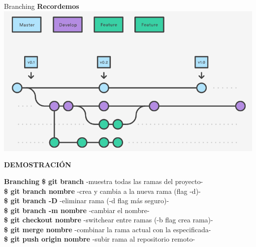 \documentclass{beamer}
\begin{document}
	\begin{frame}{Branching}
		\textbf{Recordemos}\\ \vspace{.4cm}
		\includegraphics[scale=.35]{img/git_project.png}
		
	\end{frame}

	\begin{frame}
		\textbf{DEMOSTRACIÓN} 
		\begin{block}{\textbf{Branching}}
			\vspace{0.12cm}
			\normalsize \textbf{\$ git branch}   \small -muestra todas las ramas del proyecto- \\
			\vspace{0.12cm}
			\normalsize \textbf{\$ git branch nombre}    \small -crea y cambia a la nueva rama (flag -d)-\\
			\vspace{0.12cm}
			\normalsize \textbf{\$ git branch -D }\small -eliminar rama (-d flag más seguro)-\\
			\vspace{0.12cm}
			\normalsize \textbf{\$ git branch -m nombre} \small -cambiar el nombre-\\
			\vspace{0.1cm}
			\normalsize \textbf{\$ git checkout nombre}     \small -switchear entre ramas (-b flag crea rama)-\\
			\vspace{0.12cm}
			\normalsize\textbf{\$ git merge nombre} \small -combinar la rama actual con la especificada-\\
			\vspace{0.12cm}
			\normalsize \textbf{\$ git push origin nombre} \small -subir rama al repositorio remoto-\\
			\vspace{0.3cm}
		\end{block}	
	\end{frame}
\end{document}
